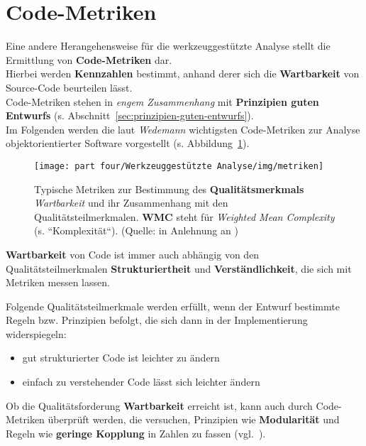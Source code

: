 \section{Code-Metriken}
Eine andere Herangehensweise für die werkzeuggestützte Analyse stellt die Ermittlung von \textbf{Code-Metriken} dar.\\
Hierbei werden \textbf{Kennzahlen} bestimmt, anhand derer sich die \textbf{Wartbarkeit} von Source-Code beurteilen lässt.\\
Code-Metriken stehen in \textit{engem Zusammenhang} mit \textbf{Prinzipien guten Entwurfs} (s. Abschnitt~\ref{sec:prinzipien-guten-entwurfs}).\\
Im Folgenden werden die laut \textit{Wedemann} wichtigsten Code-Metriken zur Analyse objektorientierter Software vorgestellt (s. Abbildung~\ref{fig:metriken}).

\begin{figure}
    \centering
    \texttt{[image: part four/Werkzeuggestützte Analyse/img/metriken]}
    \caption{Typische Metriken zur Bestimmung des \textbf{Qualitätsmerkmals} \textit{Wartbarkeit} und ihr Zusammenhang mit den Qualitätsteilmerkmalen. \textbf{WMC} steht für  \textit{Weighted Mean Complexity} (s. ``Komplexität``). (Quelle: in Anlehnung an \cite[Abb. 4.3, 37]{Wed09c})}
    \label{fig:metriken}
\end{figure}

\begin{tcolorbox}[colback=white]
    \textbf{Wartbarkeit} von Code ist immer auch abhängig von den Qualitätsteilmerkmalen \textbf{Strukturiertheit} und \textbf{Verständlichkeit}, die sich mit Metriken messen lassen.
\end{tcolorbox}
\vspace{2mm}

\noindent
Folgende Qualitätsteilmerkmale werden erfüllt, wenn der Entwurf bestimmte Regeln bzw. Prinzipien befolgt, die sich dann in der Implementierung widerspiegeln:

\begin{itemize}
    \item gut strukturierter Code ist leichter zu ändern
    \item einfach zu verstehender Code lässt sich leichter ändern
\end{itemize}

\begin{tcolorbox}
    Ob die Qualitätsforderung \textbf{Wartbarkeit} erreicht ist, kann auch durch Code-Metriken überprüft werden, die versuchen, Prinzipien wie \textbf{Modularität} und Regeln wie \textbf{geringe Kopplung} in Zahlen zu fassen (vgl.~\cite[38]{Wed09c}).
\end{tcolorbox}
\vspace{2mm}

